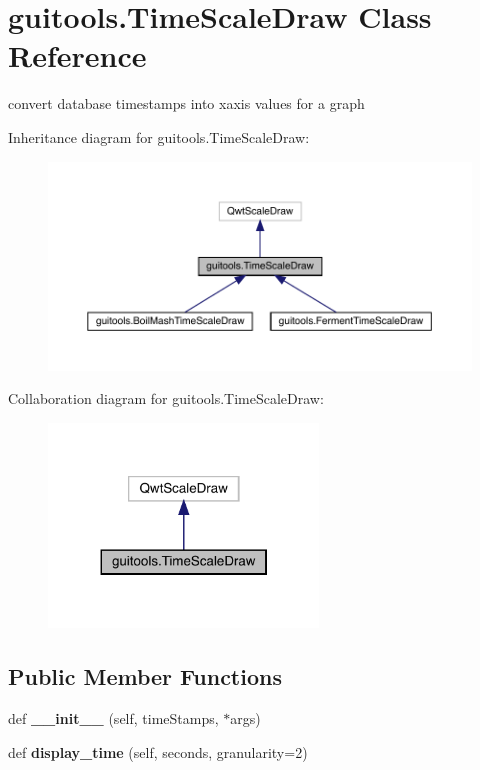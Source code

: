 \hypertarget{classguitools_1_1_time_scale_draw}{}\section{guitools.\+Time\+Scale\+Draw Class Reference}
\label{classguitools_1_1_time_scale_draw}


convert database timestamps into xaxis values for a graph  




Inheritance diagram for guitools.\+Time\+Scale\+Draw\+:\nopagebreak
\begin{figure}[H]
\begin{center}
\leavevmode
\includegraphics[width=350pt]{classguitools_1_1_time_scale_draw__inherit__graph}
\end{center}
\end{figure}


Collaboration diagram for guitools.\+Time\+Scale\+Draw\+:\nopagebreak
\begin{figure}[H]
\begin{center}
\leavevmode
\includegraphics[width=203pt]{classguitools_1_1_time_scale_draw__coll__graph}
\end{center}
\end{figure}
\subsection*{Public Member Functions}
\begin{DoxyCompactItemize}
\item 
\mbox{\label{classguitools_1_1_time_scale_draw_a353aaf6e2376288f18de71bf4fed56ed}} 
def {\bfseries \+\_\+\+\_\+init\+\_\+\+\_\+} (self, time\+Stamps, $\ast$args)
\item 
\mbox{\label{classguitools_1_1_time_scale_draw_aa82ce677ffc86900f5f523ad762af405}} 
def {\bfseries display\+\_\+time} (self, seconds, granularity=2)
\end{DoxyCompactItemize}
